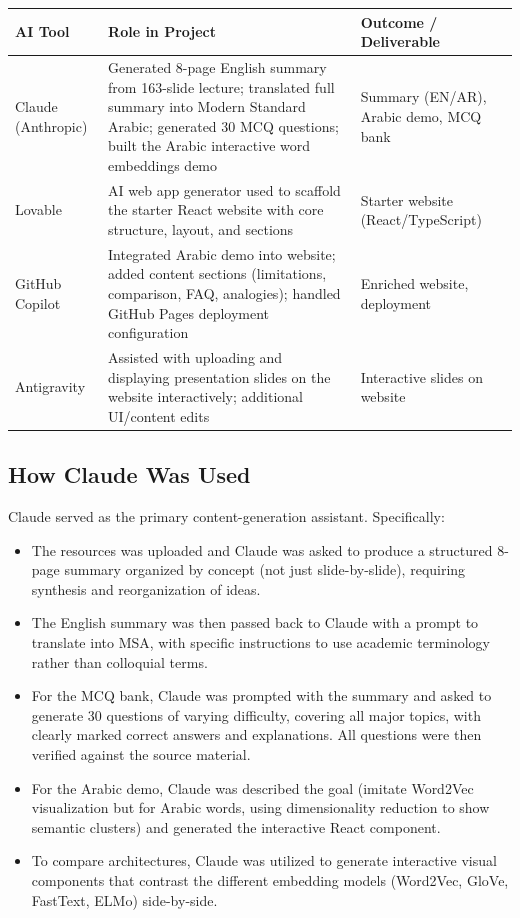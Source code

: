 \begin{table}[h!]
    \centering
    \begin{tabular}{|p{3.5cm}|p{7cm}|p{4.5cm}|}
        \hline
        \textbf{AI Tool} & \textbf{Role in Project} & \textbf{Outcome / Deliverable} \\
        \hline
        Claude (Anthropic) & Generated 8-page English summary from 163-slide lecture; translated full summary into Modern Standard Arabic; generated 30 MCQ questions; built the Arabic interactive word embeddings demo & Summary (EN/AR), Arabic demo, MCQ bank \\
        \hline
        Lovable & AI web app generator used to scaffold the starter React website with core structure, layout, and sections & Starter website (React/TypeScript) \\
        \hline
        GitHub Copilot & Integrated Arabic demo into website; added content sections (limitations, comparison, FAQ, analogies); handled GitHub Pages deployment configuration & Enriched website, deployment \\
        \hline
        Antigravity & Assisted with uploading and displaying presentation slides on the website interactively; additional UI/content edits & Interactive slides on website \\
        \hline
    \end{tabular}
\end{table}

\subsection{How Claude Was Used}
Claude served as the primary content-generation assistant. Specifically:
\begin{itemize}
    \item The resources was uploaded and Claude was asked to produce a structured 8-page summary organized by concept (not just slide-by-slide), requiring synthesis and reorganization of ideas.
    \item The English summary was then passed back to Claude with a prompt to translate into MSA, with specific instructions to use academic terminology rather than colloquial terms.
    \item For the MCQ bank, Claude was prompted with the summary and asked to generate 30 questions of varying difficulty, covering all major topics, with clearly marked correct answers and explanations. All questions were then verified against the source material.
    \item For the Arabic demo, Claude was described the goal (imitate Word2Vec visualization but for Arabic words, using dimensionality reduction to show semantic clusters) and generated the interactive React component.
    \item To compare architectures, Claude was utilized to generate interactive visual components that contrast the different embedding models (Word2Vec, GloVe, FastText, ELMo) side-by-side.
\end{itemize}

